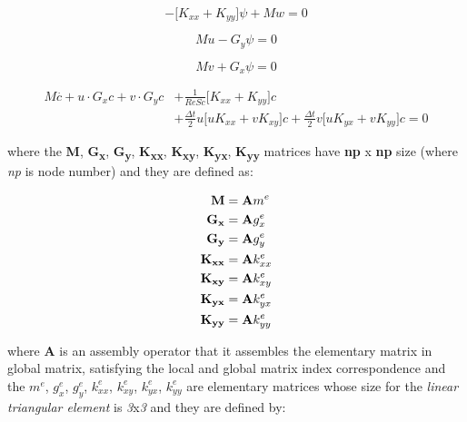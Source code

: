 \begin{equation}
 - \Big[ K_{xx} + K_{yy} \Big] \psi + Mw = 0
\end{equation}

\begin{equation}
 Mu - G_y \psi = 0
\end{equation}

\begin{equation}
 Mv + G_x \psi = 0
\end{equation}

\begin{equation}
\begin{aligned}
 M \overset{.}{c} + u \cdot G_x c + v \cdot G_y c & + \frac{1}{\textit{ReSc}} \Big[ K_{xx} + K_{yy} \Big] c
 \\[5pt]
 & + \frac{\Delta t}{2} u \Big[ u K_{xx} + v K_{xy} \Big] c
 + \frac{\Delta t}{2} v \Big[ u K_{yx} + v K_{yy} \Big] c 
 = 0 \label{concentration matrix}
\end{aligned} 
\end{equation}

\medskip
\noindent
where the \textbf{M}, \textbf{G\textsubscript{x}}, 
\textbf{G\textsubscript{y}}, \textbf{K\textsubscript{xx}},
\textbf{K\textsubscript{xy}},
\textbf{K\textsubscript{yx}}, 
\textbf{K\textsubscript{yy}} matrices
have \textbf{np} x \textbf{np} size
(where \textit{np} is node number) and
they are defined as:

\begin{align}
  \textbf{M} & = \textbf{A} m^{e}\\
  \textbf{G\textsubscript{x}} & = \textbf{A} g_{x}^{e}\\
  \textbf{G\textsubscript{y}} & = \textbf{A} g_{y}^{e} \\
  \textbf{K\textsubscript{xx}} & = \textbf{A} k_{xx}^{e} \\
  \textbf{K\textsubscript{xy}} & = \textbf{A} k_{xy}^{e} \\
  \textbf{K\textsubscript{yx}} & = \textbf{A} k_{yx}^{e} \\
  \textbf{K\textsubscript{yy}} & = \textbf{A} k_{yy}^{e}
\end{align}

\noindent
where \textbf{A} is an assembly operator
that it assembles the elementary matrix in
global matrix, satisfying the local and global matrix index
correspondence and the
$m^{e}$, 
$g^{e}_{x}$,
$g^{e}_{y}$,
$k^{e}_{xx}$,
$k^{e}_{xy}$,
$k^{e}_{yx}$,
$k^{e}_{yy}$
are elementary matrices whose
size for the  
\textit{linear triangular element} is \textit{3}x\textit{3} and
they are defined by:


